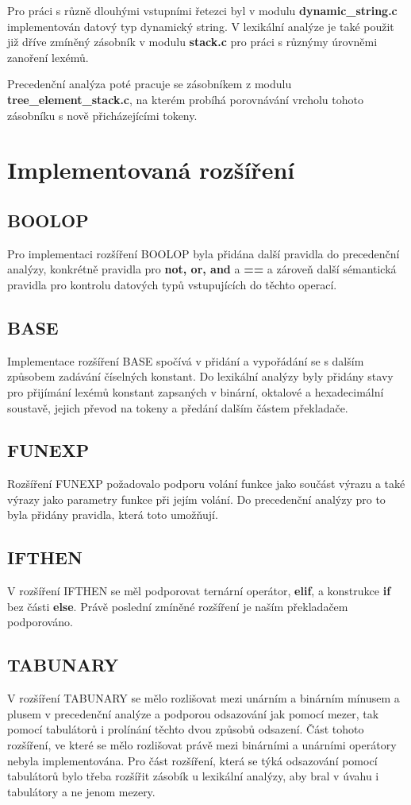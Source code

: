 \documentclass[12pt]{article}
\begin{document}
Pro práci s různě dlouhými vstupními řetezci byl v modulu \textbf{dynamic\_string.c} implementován datový typ dynamický string. V lexikální analýze je také použit již dříve zmíněný zásobník v modulu \textbf{stack.c} pro práci s různýmy úrovněmi zanoření lexémů.


Precedenční analýza poté pracuje se zásobníkem z modulu \textbf{tree\_element\_stack.c}, na kterém pro\-bí\-há porovnávání vrcholu tohoto zásobníku s nově přicházejícími tokeny.

\newpage

\section{Implementovaná rozšíření}
\subsection{BOOLOP}
Pro implementaci rozšíření BOOLOP byla přidána další pravidla do precedenční analýzy, konkrétně pravidla pro \textbf{not, or, and} a \textbf{==} a zároveň další sémantická pravidla pro kontrolu datových typů vstupujících do těchto operací.

\subsection{BASE}
Implementace rozšíření BASE spočívá v přidání a vypořádání se s dalším způsobem zadávání čí\-sel\-ných konstant. Do lexikální analýzy byly přidány stavy pro přijímání lexémů konstant zapsaných v binární, oktalové a hexadecimální soustavě, jejich převod na tokeny a předání dalším částem pře\-kla\-da\-če.

\subsection{FUNEXP}
Rozšíření FUNEXP požadovalo podporu volání funkce jako součást výrazu a také výrazy jako parametry funkce při jejím volání. Do precedenční analýzy pro to byla přidány pravidla, která toto umožňují.

\subsection{IFTHEN}
V rozšíření IFTHEN se měl podporovat ternární operátor, \textbf{elif}, a konstrukce \textbf{if} bez části \textbf{else}. Právě poslední zmíněné rozšíření je naším překladačem podporováno.

\subsection{TABUNARY}
V rozšíření TABUNARY se mělo rozlišovat mezi unárním a bi\-nár\-ním mínusem a plusem v precedenční analýze a podporou odsazování jak pomocí mezer, tak pomocí tabulátorů i prolínání těchto dvou způsobů odsazení. Část tohoto rozšíření, ve které se mělo rozlišovat právě mezi binárními a unárními operátory nebyla implementována. Pro část rozšíření, která se týká odsazování pomocí tabulátorů bylo třeba rozšířit zásobík u lexikální analýzy, aby bral v úvahu i tabulátory a ne jenom mezery.
\end{document}
